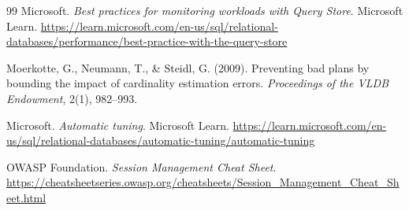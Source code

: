 \documentclass[11pt,a4paper]{report}
\begin{document}
\begin{thebibliography}{99}
 Microsoft. \textit{Best practices for monitoring workloads with Query Store}. Microsoft Learn. \url{https://learn.microsoft.com/en-us/sql/relational-databases/performance/best-practice-with-the-query-store}

 Moerkotte, G., Neumann, T., \& Steidl, G. (2009). Preventing bad plans by bounding the impact of cardinality estimation errors. \textit{Proceedings of the VLDB Endowment}, 2(1), 982--993.

 Microsoft. \textit{Automatic tuning}. Microsoft Learn. \url{https://learn.microsoft.com/en-us/sql/relational-databases/automatic-tuning/automatic-tuning}

 OWASP Foundation. \textit{Session Management Cheat Sheet}. \url{https://cheatsheetseries.owasp.org/cheatsheets/Session_Management_Cheat_Sheet.html}

\end{thebibliography}
\end{document}
